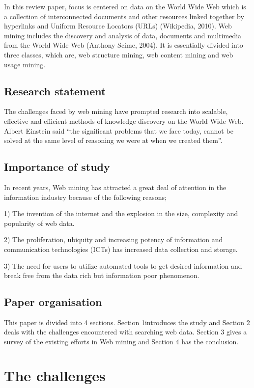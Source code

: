 \documentclass{article}
\begin{document}
In this review paper, focus is centered on data on the World Wide Web which is a collection of interconnected documents and other resources linked together by hyperlinks and Uniform Resource Locators (URLs) (Wikipedia, 2010).
 Web mining includes the discovery and analysis of data, documents and multimedia from the World Wide Web (Anthony Scime, 2004). It is essentially divided into three classes, which are, web structure mining, web content mining and web usage mining.

\subsection{Research statement}

The challenges faced by web mining have prompted research into scalable, effective and efficient methods of knowledge discovery on the World Wide Web. Albert Einstein said “the significant problems that we face today, cannot be solved at the same level of reasoning we were at when we created them”.
\subsection{Importance of study}
In recent years, Web mining has attracted a great deal of attention in the information industry because of the following reasons;

1)	The invention of the internet and the explosion in the size, complexity and popularity of web data.

2)	The proliferation, ubiquity and increasing potency of information and communication technologies (ICTs) has increased data collection and storage.

3)	The need for users to utilize automated tools to get desired information and break free from the  data rich but information poor phenomenon.


\subsection{Paper organisation}

This paper is divided into 4 sections. Section 1introduces the study and Section 2 deals with the challenges encountered with searching web data. Section 3 gives a survey of the existing efforts in Web mining and Section 4 has the conclusion.

\section{The challenges}
\end{document}
